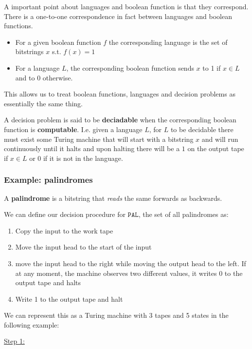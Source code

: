 \documentclass{article}
\begin{document}
A important point about languages and boolean function is that they correspond. There is a one-to-one correspondence in fact between languages and boolean functions.
\begin{itemize}
  \item For a given boolean function $f$ the corresponding language is the set of bitstrings $x$ s.t. $f(x) = 1$
  \item For a language $L$, the corresponding boolean function sends $x$ to 1 if $x \in L$ and to $0$ otherwise.
\end{itemize}

This allows us to treat boolean functions, languages and decision problems as essentially the same thing.

A decision problem is said to be \textbf{deciadable} when the corresponding boolean function is \textbf{computable}. I.e. given a language $L$, for $L$ to be decidable there must exist some Turing machine that will start with a bitstring $x$ and will run continuously until it halts and upon halting there will be a $1$ on the output tape if $x \in L$ or $0$ if it is not in the language.

\subsubsection{Example: palindromes}

A \textbf{palindrome} is a bitstring that \textit{reads} the same forwards as backwards.

We can define our decision procedure for $\texttt{PAL} $, the set of all palindromes as:

\begin{enumerate}
  \item Copy the input to the work tape
  \item Move the input head to the start of the input
  \item move the input head to the right while moving the output head to the left. If at any moment, the machine observes two different values, it writes 0 to the output tape and halts
  \item Write 1 to the output tape and halt
\end{enumerate}

We can represent this as a Turing machine with 3 tapes and 5 states in the following example:

\underline{Step 1:}
\end{document}
